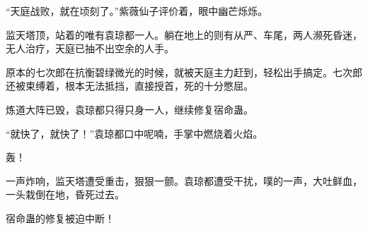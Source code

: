 \begin{this_body}
“天庭战败，就在顷刻了。”紫薇仙子评价着，眼中幽芒烁烁。

监天塔顶，站着的唯有袁琼都一人。躺在地上的则有从严、车尾，两人濒死昏迷，无人治疗，天庭已抽不出空余的人手。

原本的七次郎在抗衡碧绿微光的时候，就被天庭主力赶到，轻松出手搞定。七次郎还被束缚着，根本无法抵挡，直接授首，死的十分憋屈。

炼道大阵已毁，袁琼都只得只身一人，继续修复宿命蛊。

“就快了，就快了！”袁琼都口中呢喃，手掌中燃烧着火焰。

轰！

一声炸响，监天塔遭受重击，狠狠一颤。袁琼都遭受干扰，噗的一声，大吐鲜血，一头栽倒在地，昏死过去。

宿命蛊的修复被迫中断！

\end{this_body}


